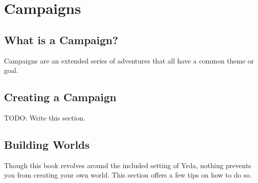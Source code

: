 \chapter{Campaigns}

\begin{multicols}{2}

\section{What is a Campaign?}

Campaigns are an extended series of adventures that all have
a common theme or goal.

\section{Creating a Campaign}

TODO: Write this section.

\section{Building Worlds}

Though this book revolves around the included setting of Yrda,
nothing prevents you from creating your own world. This section
offers a few tips on how to do so.

\end{multicols}
